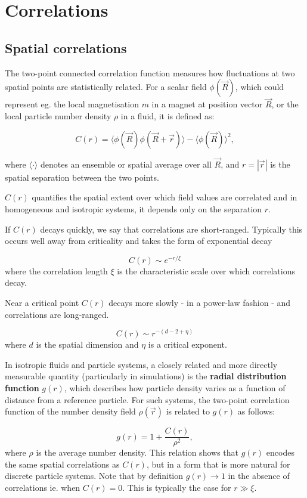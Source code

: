 \documentclass[
  letterpaper,
  enabledeprecatedfontcommands]{report}
\begin{document}
\section{Correlations}\label{sec-correlations}

\subsection{Spatial correlations}\label{spatial-correlations}

The two-point connected correlation function measures how fluctuations
at two spatial points are statistically related. For a scalar field
\(\phi(\vec{R})\), which could represent eg. the local magnetisation
\(m\) in a magnet at position vector \(\vec{R}\), or the local particle
number density \(\rho\) in a fluid, it is defined as:

\[
C(r) = \langle \phi(\vec{R}) \phi(\vec{R} + \vec{r}) \rangle - \langle \phi(\vec{R}) \rangle^2,
\]

where \(\langle \cdot \rangle\) denotes an ensemble or spatial average
over all \(\vec{R}\), and \(r = |\vec{r}|\) is the spatial separation
between the two points.

\(C(r)\) quantifies the spatial extent over which field values are
correlated and in homogeneous and isotropic systems, it depends only on
the separation \(r\).

If \(C(r)\) decays quickly, we say that correlations are short-ranged.
Typically this occurs well away from criticality and takes the form of
exponential decay

\[
  C(r) \sim e^{-r/\xi}
  \] where the correlation length \(\xi\) is the characteristic scale
over which correlations decay.

Near a critical point \(C(r)\) decays more slowly - in a power-law
fashion - and correlations are long-ranged.

\[
  C(r) \sim r^{-(d - 2 + \eta)}
  \] where \(d\) is the spatial dimension and \(\eta\) is a critical
exponent.

In isotropic fluids and particle systems, a closely related and more
directly measurable quantity (particularly in simulations) is the
\textbf{radial distribution function} \(g(r)\), which describes how
particle density varies as a function of distance from a reference
particle. For such systems, the two-point correlation function of the
number density field \(\rho(\vec{r})\) is related to \(g(r)\) as
follows:

\[
g(r) = 1+\frac{C(r)}{\rho^2},
\] where \(\rho\) is the average number density. This relation shows
that \(g(r)\) encodes the same spatial correlations as \(C(r)\), but in
a form that is more natural for discrete particle systems. Note that by
definition \(g(r)\to 1\) in the absence of correlations ie. when
\(C(r)=0\). This is typically the case for \(r\gg\xi\).
\end{document}
